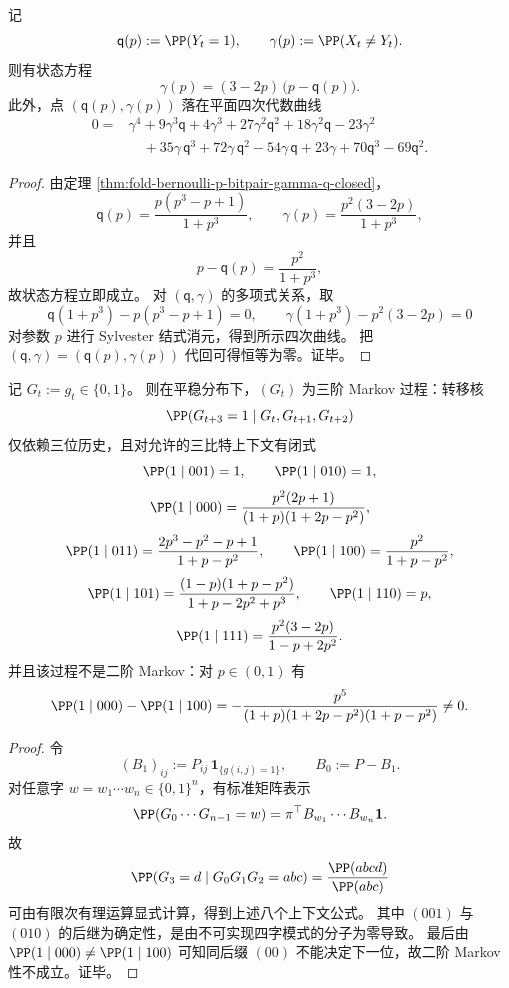 \begin{theorem}\label{thm:fold-bernoulli-p-output-mismatch-elimination-curve}
记
\[
\mathsf q(p):=\PP(Y_t=1),\qquad
\gamma(p):=\PP(X_t\neq Y_t).
\]
则有状态方程
\[
\gamma(p)=(3-2p)\,\bigl(p-\mathsf q(p)\bigr).
\]
此外，点 \((\mathsf q(p),\gamma(p))\) 落在平面四次代数曲线
\[
\begin{aligned}
0={}&\gamma^{4}+9\gamma^{3}\mathsf q+4\gamma^{3}
+27\gamma^{2}\mathsf q^{2}+18\gamma^{2}\mathsf q-23\gamma^{2}\\
&\quad+35\gamma\,\mathsf q^{3}+72\gamma\,\mathsf q^{2}-54\gamma\,\mathsf q+23\gamma
+70\mathsf q^{3}-69\mathsf q^{2}.
\end{aligned}
\]
\end{theorem}
\begin{proof}
由定理 \ref{thm:fold-bernoulli-p-bitpair-gamma-q-closed}，
\[
\mathsf q(p)=\frac{p(p^3-p+1)}{1+p^3},\qquad
\gamma(p)=\frac{p^2(3-2p)}{1+p^3},
\]
并且
\[
p-\mathsf q(p)=\frac{p^2}{1+p^3},
\]
故状态方程立即成立。
对 \((\mathsf q,\gamma)\) 的多项式关系，取
\[
\mathsf q(1+p^3)-p(p^3-p+1)=0,\qquad
\gamma(1+p^3)-p^2(3-2p)=0
\]
对参数 \(p\) 进行 Sylvester 结式消元，得到所示四次曲线。
把 \((\mathsf q,\gamma)=(\mathsf q(p),\gamma(p))\) 代回可得恒等为零。证毕。
\end{proof}

\begin{theorem}\label{thm:fold-bernoulli-p-mismatch-strict-third-order-markov}
记 \(G_t:=g_t\in\{0,1\}\)。
则在平稳分布下，\((G_t)\) 为三阶 Markov 过程：转移核
\[
\PP(G_{t+3}=1\mid G_t,G_{t+1},G_{t+2})
\]
仅依赖三位历史，且对允许的三比特上下文有闭式
\[
\PP(1\mid 001)=1,\qquad \PP(1\mid 010)=1,
\]
\[
\PP(1\mid 000)=\frac{p^{2}(2p+1)}{(1+p)(1+2p-p^{2})},
\]
\[
\PP(1\mid 011)=\frac{2p^{3}-p^{2}-p+1}{1+p-p^{2}},
\qquad
\PP(1\mid 100)=\frac{p^{2}}{1+p-p^{2}},
\]
\[
\PP(1\mid 101)=\frac{(1-p)(1+p-p^{2})}{1+p-2p^{2}+p^{3}},
\qquad
\PP(1\mid 110)=p,
\]
\[
\PP(1\mid 111)=\frac{p^{2}(3-2p)}{1-p+2p^{2}}.
\]
并且该过程不是二阶 Markov：对 \(p\in(0,1)\) 有
\[
\PP(1\mid 000)-\PP(1\mid 100)
=-\frac{p^5}{(1+p)(1+2p-p^2)(1+p-p^2)}\neq 0.
\]
\end{theorem}
\begin{proof}
令
\[
(B_1)_{ij}:=P_{ij}\,\mathbf 1_{\{g(i,j)=1\}},\qquad B_0:=P-B_1.
\]
对任意字 \(w=w_1\cdots w_n\in\{0,1\}^n\)，有标准矩阵表示
\[
\PP(G_0\cdots G_{n-1}=w)
=\pi^\top B_{w_1}\cdots B_{w_n}\mathbf 1.
\]
故
\[
\PP(G_3=d\mid G_0G_1G_2=abc)
=\frac{\PP(abcd)}{\PP(abc)}
\]
可由有限次有理运算显式计算，得到上述八个上下文公式。
其中 \((001)\) 与 \((010)\) 的后继为确定性，是由不可实现四字模式的分子为零导致。
最后由
\(
\PP(1\mid 000)\neq \PP(1\mid 100)
\)
可知同后缀 \((00)\) 不能决定下一位，故二阶 Markov 性不成立。证毕。
\end{proof}

